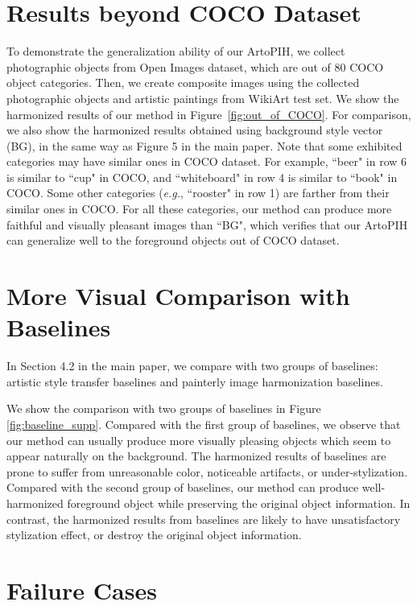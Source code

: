 \documentclass[letterpaper]{article} %
\begin{document}
\section{Results beyond COCO Dataset} \label{sec:out_of_COCO}
To demonstrate the generalization ability of our ArtoPIH, we collect  photographic objects from Open Images \cite{Kuznetsova2020TheOI} dataset, which are out of $80$ COCO \cite{lin2014microsoft} object categories. Then, we create composite images using the collected photographic objects and artistic paintings from WikiArt \cite{nichol2016painter} test set. We show the harmonized results of our method in Figure~\ref{fig:out_of_COCO}. For comparison, we also show the harmonized results obtained using background style vector (BG), in the same way as Figure 5 in the main paper. Note that some exhibited categories may have similar ones in COCO dataset. For example, ``beer" in row 6 is similar to ``cup" in COCO, and ``whiteboard" in row 4 is similar to ``book" in COCO. Some other categories (\emph{e.g.}, ``rooster" in row 1) are farther from their similar ones in COCO. For all these categories, our method can produce more faithful and visually pleasant images than ``BG", which verifies that our ArtoPIH can generalize well to the foreground objects out of COCO dataset. 

\section{More Visual Comparison with Baselines} \label{sec:cmp_with_baseline}

In Section 4.2 in the main paper, we compare with two groups of baselines: artistic style transfer baselines and painterly image harmonization baselines.  

We show the comparison with two groups of baselines in Figure \ref{fig:baseline_supp}. Compared with the first group of baselines, we observe that our method can usually produce more visually pleasing objects which seem to appear naturally on the background. The harmonized results of baselines are prone to  suffer from unreasonable color, noticeable artifacts, or under-stylization. Compared with the second group of baselines, our method can produce well-harmonized foreground object while preserving the original object information. In contrast, the harmonized results from baselines are likely to have unsatisfactory stylization effect, or destroy the original object information. 


\section{Failure Cases} \label{sec:failure_case}
\end{document}
